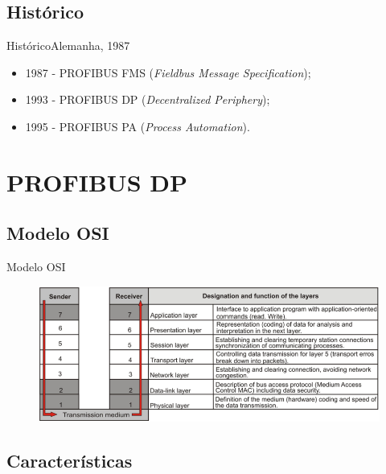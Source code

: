 \documentclass{beamer}
\begin{document}
\subsection{Histórico}

\begin{frame}{Histórico}{Alemanha, 1987}

	\begin{itemize}
		\item 1987 - PROFIBUS FMS (\textit{Fieldbus Message Specification});
		\item 1993 - PROFIBUS DP (\textit{Decentralized Periphery});
		\item 1995 - PROFIBUS PA (\textit{Process Automation}).
		
	\end{itemize}
 
\end{frame}


\section{PROFIBUS DP}

\subsection{Modelo OSI}

\begin{frame}{Modelo OSI}

	\begin{figure}
	\centering
	\includegraphics[scale=0.4]{figs/osi}
	\end{figure}

\end{frame}

\subsection{Características}
\end{document}
